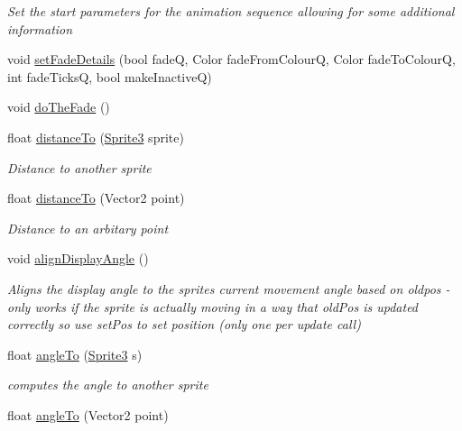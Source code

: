 \begin{DoxyCompactItemize}
\begin{DoxyCompactList}\small\item\em Set the start parameters for the animation sequence allowing for some additional information \end{DoxyCompactList}\item 
void \mbox{\hyperlink{class_r_c___framework_1_1_sprite3_a03369c23f152dc9720174e5053acd33f}{set\+Fade\+Details}} (bool fadeQ, Color fade\+From\+ColourQ, Color fade\+To\+ColourQ, int fade\+TicksQ, bool make\+InactiveQ)
\item 
void \mbox{\hyperlink{class_r_c___framework_1_1_sprite3_a2710ebb2e7b64a1ce4ce91aaf81f5fce}{do\+The\+Fade}} ()
\item 
float \mbox{\hyperlink{class_r_c___framework_1_1_sprite3_a58e467760eaf53fa02f50fb4129861c3}{distance\+To}} (\mbox{\hyperlink{class_r_c___framework_1_1_sprite3}{Sprite3}} sprite)
\begin{DoxyCompactList}\small\item\em Distance to another sprite \end{DoxyCompactList}\item 
float \mbox{\hyperlink{class_r_c___framework_1_1_sprite3_ab41ca8d75520f2b6e11ba943d7eb3f77}{distance\+To}} (Vector2 point)
\begin{DoxyCompactList}\small\item\em Distance to an arbitary point \end{DoxyCompactList}\item 
void \mbox{\hyperlink{class_r_c___framework_1_1_sprite3_a92e3abec80772414657159820d45491a}{align\+Display\+Angle}} ()
\begin{DoxyCompactList}\small\item\em Aligns the display angle to the sprites current movement angle based on oldpos -\/ only works if the sprite is actually moving in a way that old\+Pos is updated correctly so use set\+Pos to set position (only one per update call) \end{DoxyCompactList}\item 
float \mbox{\hyperlink{class_r_c___framework_1_1_sprite3_a5354cb9f7ec64fa47814f67ee05d5fa5}{angle\+To}} (\mbox{\hyperlink{class_r_c___framework_1_1_sprite3}{Sprite3}} s)
\begin{DoxyCompactList}\small\item\em computes the angle to another sprite \end{DoxyCompactList}\item 
float \mbox{\hyperlink{class_r_c___framework_1_1_sprite3_a61485db626575e2a63c7ba078f84d46d}{angle\+To}} (Vector2 point)

\end{DoxyCompactItemize}
